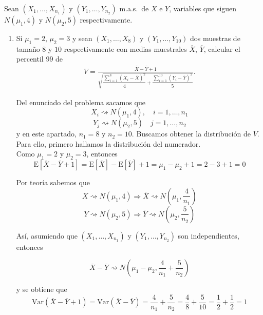\documentclass[12pt]{article}
\newcommand{\E}{\mathrm{E}}
\newcommand{\V}{\mathrm{Var}}
\begin{document}
    \begin{ejercicio}
        Sean $(X_1,\dots,X_{n_1})$ y $(Y_1,\dots,Y_{n_2})$ m.a.s.\ de $X$ e $Y$, variables que siguen
        $N(\mu_1,4)$ y $N(\mu_2,5)$ respectivamente.

        \begin{enumerate}
            \item[a)] Si $\mu_1=2$, $\mu_2=3$ y sean $(X_1,\dots,X_8)$ y $(Y_1,\dots,Y_{10})$ dos muestras
            de tamaño $8$ y $10$ respectivamente con medias muestrales $\overline X$, $\overline Y$,
            calcular el percentil $99$ de
            \begin{gather}
                V=\frac{\overline X-\overline Y+1}
                {\sqrt{\dfrac{\displaystyle\sum_{i=1}^8 (X_i-\overline X)^2}{4}
                +\dfrac{\displaystyle\sum_{i=1}^{10}(Y_i-\overline Y)^2}{5}}}.
                \tag{1}
            \end{gather}

            Del enunciado del problema sacamos que 
            $$X_i \rightsquigarrow N(\mu_1, 4), \quad i=1,\ldots,n_1$$
            $$Y_j \rightsquigarrow N(\mu_2,5) \quad j=1,\ldots, n_2$$
            y en este apartado, $n_1 = 8$ y $n_2 = 10$. Buscamos obtener la 
            distribución de $V$. Para ello, primero hallamos la distribución del numerador. \\

            Como $\mu_1 = 2$ y $\mu_2 = 3$, entonces 
            $$\E[\overline{X} - \overline{Y} + 1] = \E[\overline{X}] - \E[\overline{Y}] + 1 = 
            \mu_1 - \mu_2 + 1 = 2 - 3 + 1 = 0$$

            Por teoría sabemos que
            $$X \rightsquigarrow N(\mu_1, 4) \Longrightarrow \overline{X} \rightsquigarrow N \left( \mu_1, \dfrac{4}{n_1} \right)$$
            $$Y \rightsquigarrow N(\mu_2, 5) \Longrightarrow \overline{Y} \rightsquigarrow N \left( \mu_2, \dfrac{5}{n_2} \right)$$

            Así, asumiendo que $(X_1,\dots,X_{n_1})$ y $(Y_1,\dots,Y_{n_2})$ son independientes, entonces
            
            $$\overline{X} - \overline{Y} \rightsquigarrow N \left( \mu_1 - \mu_2, \dfrac{4}{n_1} + \dfrac{5}{n_2} \right)$$

            y se obtiene que
            $$\V(\overline{X} - \overline{Y} + 1) = \V(\overline{X} - \overline{Y}) = \dfrac{4}{n_1} + \dfrac{5}{n_2} = \dfrac{4}{8} + \dfrac{5}{10} = \dfrac{1}{2} + \dfrac{1}{2} = 1$$


\end{enumerate}
\end{ejercicio}
\end{document}
